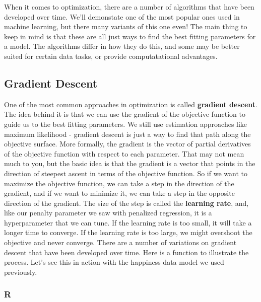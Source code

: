 \documentclass[
  letterpaper,
]{krantz}
\begin{document}
When it comes to optimization, there are a number of algorithms that
have been developed over time. We'll demonstate one of the most popular
ones used in machine learning, but there many variants of this one even!
The main thing to keep in mind is that these are all just ways to find
the best fitting parameters for a model. The algorithms differ in how
they do this, and some may be better suited for certain data tasks, or
provide computatational advantages.

\subsection{Gradient Descent}\label{sec-estim-opt-algos-gd}

One of the most common approaches in optimization is called
\textbf{gradient descent}. The idea behind it is that we can use the
gradient of the objective function to guide us to the best fitting
parameters. We still use estimation approaches like maximum likelihood -
gradient descent is just a way to find that path along the objective
surface. More formally, the gradient is the vector of partial
derivatives of the objective function with respect to each parameter.
That may not mean much to you, but the basic idea is that the gradient
is a vector that points in the direction of steepest ascent in terms of
the objective function. So if we want to maximize the objective
function, we can take a step in the direction of the gradient, and if we
want to minimize it, we can take a step in the opposite direction of the
gradient. The size of the step is called the \textbf{learning rate},
and, like our penalty parameter we saw with penalized regression, it is
a hyperparameter that we can tune. If the learning rate is too small, it
will take a longer time to converge. If the learning rate is too large,
we might overshoot the objective and never converge. There are a number
of variations on gradient descent that have been developed over time.
Here is a function to illustrate the process. Let's see this in action
with the happiness data model we used previously.

\subsubsection{R}
\end{document}
